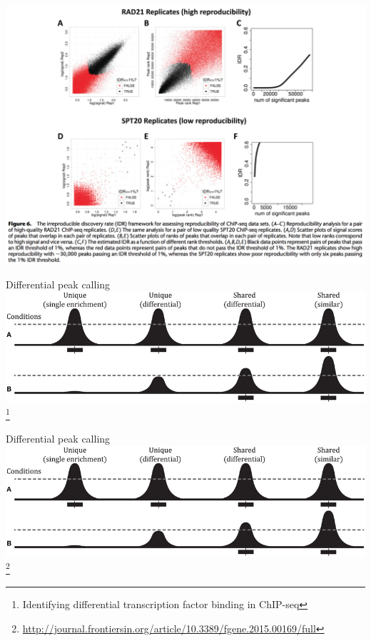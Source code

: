\documentclass{beamer}
\begin{document}
\begin{frame}
\includegraphics[width=\linewidth]{idr.png}
\end{frame}

\begin{frame}{Differential peak calling}
\includegraphics[width=\linewidth]{diff_peaks.jpg}\footnote{Identifying differential transcription factor binding in ChIP-seq}
\end{frame}

\begin{frame}{Differential peak calling}
\includegraphics[width=\linewidth]{diff_peaks.jpg}\footnote{\url{http://journal.frontiersin.org/article/10.3389/fgene.2015.00169/full}}
\end{frame}
\end{document}
